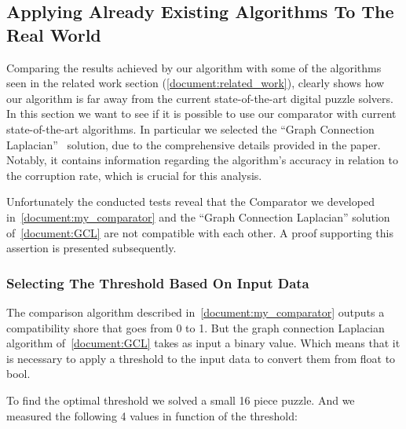\documentclass{article}
\begin{document}
\subsection{Applying Already Existing Algorithms To The Real World}

Comparing the results achieved by our algorithm with some of the algorithms seen in the related
work section (\cref{document:related_work}), clearly shows how our algorithm is far away
from the current state-of-the-art digital puzzle solvers. In this section we want to
see if it is possible to use our comparator with current state-of-the-art algorithms.
In particular we selected the ``Graph Connection Laplacian''~\cite{GCL} solution, due to the
comprehensive details provided in the paper. Notably, it contains information
regarding the algorithm's accuracy in relation to the corruption rate,
which is crucial for this analysis.

Unfortunately the conducted tests reveal that the Comparator we developed in~\cref{document:my_comparator}
and the ``Graph Connection Laplacian'' solution of~\cref{document:GCL}
are not compatible with each other.
A proof supporting this assertion is presented subsequently.


\subsubsection{Selecting The Threshold Based On Input Data}

The comparison algorithm described in~\cref{document:my_comparator} outputs a compatibility
shore that goes from 0 to 1.\newline
But the graph connection Laplacian algorithm of~\cref{document:GCL} takes as input a binary value.
Which means that it is necessary to apply a threshold to the input
data to convert them from float to bool.

To find the optimal threshold we solved a small 16 piece puzzle.
And we measured the following 4 values in function of the threshold:
\end{document}
